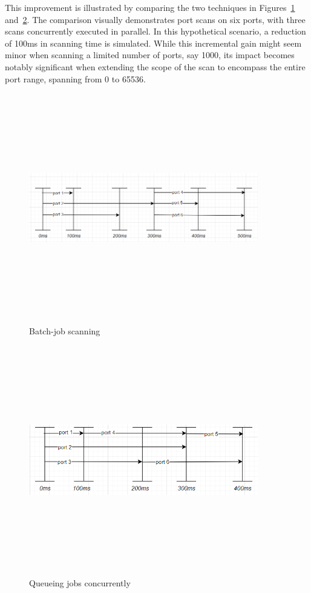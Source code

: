 This improvement is illustrated by comparing the two techniques in Figures~\ref{fig:batch-job} and~\ref{fig:queue-job}. The comparison visually demonstrates port scans on six ports, with three scans concurrently executed in parallel. In this hypothetical scenario, a reduction of 100ms in scanning time is simulated. While this incremental gain might seem minor when scanning a limited number of ports, say 1000, its impact becomes notably significant when extending the scope of the scan to encompass the entire port range, spanning from 0 to 65536.

\begin{figure}[htbp]
    \centering
\includegraphics[width=10cm, height=10cm, keepaspectratio]{port_scanning_techniques/img/batch-job.png}
    \caption{Batch-job scanning}
    \label{fig:batch-job}
\end{figure}

\begin{figure}[htbp]
    \centering
\includegraphics[width=10cm, height=10cm, keepaspectratio]{port_scanning_techniques/img/queue-job.png}
    \caption{Queueing jobs concurrently}
    \label{fig:queue-job}
\end{figure}

